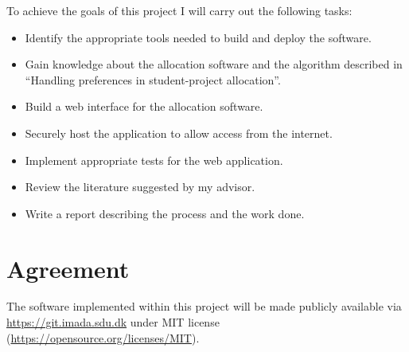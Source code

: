 \documentclass{article}
\begin{document}
To achieve the goals of this project I will carry out the following tasks:
\begin{itemize}
	\item Identify the appropriate tools needed to build and deploy the software.
	\item Gain knowledge about the allocation software and the algorithm described in ``Handling preferences in student-project allocation''\cite{Chiarandini2019}.
	\item Build a web interface for the allocation software.
	\item Securely host the application to allow access from the internet.
	\item Implement appropriate tests for the web application. 
	\item Review the literature suggested by my advisor.
	\item Write a report describing the process and the work done.
\end{itemize}
\section{Agreement}

The software implemented within this project will be made publicly available via \url{https://git.imada.sdu.dk} under MIT license (\url{https://opensource.org/licenses/MIT}).




\end{document}
